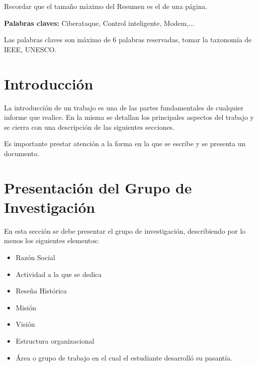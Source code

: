 \documentclass[12pt,letterpaper]{report}
\begin{document}
Recordar que el tamaño máximo del Resumen es el de una página.

\textbf{Palabras claves:} Ciberataque, Control inteligente, Modem,...

Las palabras claves son máximo de 6 palabras reservadas, tomar la taxonomía de IEEE, UNESCO.

\newpage
{}
\setcounter{page}{1}

\chapter{Introducción}

La introducción de un trabajo es una de las partes fundamentales de cualquier informe que realice. En la misma se detallan los principales aspectos del trabajo y se cierra con una descripción de las siguientes secciones.

Es importante prestar atención a la forma en la que se escribe y se presenta un documento.

\chapter{Presentación del Grupo de Investigación}

En esta sección se debe presentar el grupo de investigación, describiendo por lo menos los siguientes elementos:

\begin{itemize}
    \setlength\itemsep{6pt}
    \item Razón Social
    \item Actividad a la que se dedica
    \item Reseña Histórica
    \item Misión
    \item Visión
    \item Estructura organizacional
    \item Área o grupo de trabajo en el cual el estudiante desarrolló su pasantía.
\end{itemize}

\end{document}
